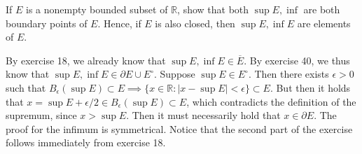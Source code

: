 \begin{exercise}{42}
    If $E$ is a nonempty bounded subset of $\mathbb{R}$, show that both $\sup E, \inf $ are both boundary points of $E$.
    Hence, if $E$ is also closed, then $\sup E, \inf E$ are elements of $E$.
\end{exercise}

\begin{solution}
    
    By exercise 18, we already know that $\sup E, \inf E \in \overline{E}$.
    By exercise 40, we thus know that $\sup E, \inf E \in \partial E \cup E^\circ$.
    Suppose $\sup E \in E^\circ$.
    Then there exists $\epsilon > 0$ such that $B_{\epsilon}(\sup E) \subset E \implies \{x \in \mathbb{R}: \lvert x - \sup E \rvert < \epsilon\} \subset E$.
    But then it holds that $x = \sup E + \epsilon/2 \in B_{\epsilon}(\sup E) \subset E$, which contradicts the definition of the supremum, since $x > \sup E$.
    Then it must necessarily hold that $x \in \partial E$.
    The proof for the infimum is symmetrical.
    Notice that the second part of the exercise follows immediately from exercise 18.
\end{solution}